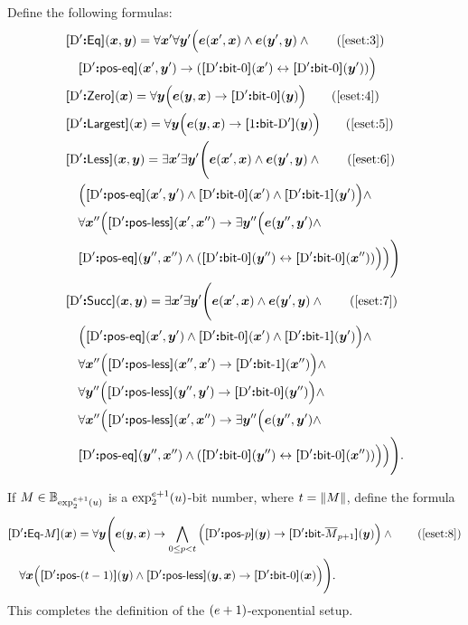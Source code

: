 Define the following formulas:
\begin{align}
  &\fEq\DSp(\xx,\yy) = \forall\xxp\forall\yyp\Big(\se(\xxp,\xx) \land
  \se(\yyp,\yy) \land \tag{\ref{eset:3}} \\
  &\quad\fposeq\DSp(\xxp,\yyp) \limp (\fbitO\DSp(\xxp) \lequ
  \fbitO\DSp(\yyp))\Big)
  \nonumber \\
  &\fZero\DSp(\xx) = \forall\yy\Big(\se(\yy,\xx) \limp \fbitO\DSp(\yy)\Big)
  \tag{\ref{eset:4}} \\
  &\fLargest\DSp(\xx) = \forall\yy\Big(\se(\yy,\xx) \limp \fbit1\DSp(\yy)\Big)
  \tag{\ref{eset:5}} \\
  &\fLess\DSp(\xx,\yy) = \exists\xxp\exists\yyp\Bigg(\se(\xxp,\xx) \land
  \se(\yyp,\yy) \land \tag{\ref{eset:6}} \\
  &\quad\Big(\fposeq\DSp(\xxp,\yyp) \land \fbitO\DSp(\xxp) \land
  \fbitI\DSp(\yyp)\Big) \land \nonumber \\
  &\quad\forall\xxpp\Big(\fposless\DSp(\xxp,\xxpp) \limp \exists\yypp\Big(
  \se(\yypp,\yyp) \land \nonumber \\
  &\quad\fposeq\DSp(\yypp,\xxpp) \land (\fbitO\DSp(\yypp) \lequ
  \fbitO\DSp(\xxpp)) \Big)\Big)\Bigg) \nonumber \\
  &\fSucc\DSp(\xx,\yy) = \exists\xxp\exists\yyp\Bigg(\se(\xxp,\xx) \land
  \se(\yyp,\yy) \land \tag{\ref{eset:7}} \\
  &\quad\Big(\fposeq\DSp(\xxp,\yyp) \land \fbitO\DSp(\xxp) \land
  \fbitI\DSp(\yyp)\Big) \land \nonumber \\
  &\quad\forall\xxpp\Big(\fposless\DSp(\xxpp,\xxp) \limp \fbitI\DSp(\xxpp)\Big)
  \land \nonumber \\
  &\quad\forall\yypp\Big(\fposless\DSp(\yypp,\yyp) \limp \fbitO\DSp(\yypp)\Big)
  \land \nonumber \\
  &\quad\forall\xxpp\Big(\fposless\DSp(\xxp,\xxpp) \limp \exists\yypp\Big(
  \se(\yypp,\yyp) \land \nonumber \\
  &\quad\fposeq\DSp(\yypp,\xxpp) \land (\fbitO\DSp(\yypp) \lequ
  \fbitO\DSp(\xxpp))\Big)\Big)\Bigg). \nonumber
\end{align}

If $\nM \in \tBitnums{\tetr{\sze+1}2\szu}$ is a $\tetr{\sze+1}2\szu$-bit number,
where $\tbit = \bsz\nM$, define the formula
\begin{align}
&\fDataA\DSp\nM(\xx) = \forall\yy\Bigg(\se(\yy,\xx) \limp
\bigwedge_{0 \leq \posp < \tbit} \Big(\fposA\DSp\posp(\yy) \limp
\fbit\DSp{\benc{\nM}_{\posp+1}}(\yy)\Big) \land \tag{\ref{eset:8}} \\
&\quad\forall\xx\Big(\fposA\DSp{(\tbit-1)}(\yy) \land 
\fposless\DSp(\yy,\xx) \limp \fbitO\DSp(\xx)\Big)\Bigg). \nonumber
\end{align}
This completes the definition of the $(\sze+1)$-exponential setup.

